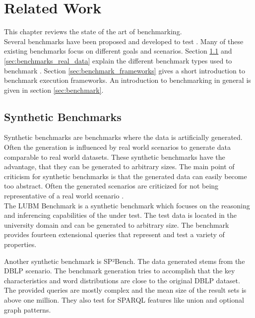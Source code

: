 \chapter{Related Work}
\label{ch:related_work}

This chapter reviews the state of the art of \ts{} benchmarking.\\

Several benchmarks have been proposed and developed to test \tsp{}.
Many of these existing benchmarks focus on different goals and scenarios.
Section \ref{sec:synthetic_benchmarks} and \ref{sec:benchmarks_real_data} explain the different benchmark types used to benchmark \tsp{}.
Section \ref{sec:benchmark_frameworks} gives a short introduction to benchmark execution frameworks.
An introduction to benchmarking in general is given in section \ref{sec:benchmark}.

\section{Synthetic Benchmarks}
\label{sec:synthetic_benchmarks}
Synthetic benchmarks are benchmarks where the data is artificially generated.
Often the generation is influenced by real world scenarios to generate data comparable to real world datasets\cite{guoLUBMBenchmarkOWL2005}.
These synthetic benchmarks have the advantage, that they can be generated to arbitrary sizes.
The main point of criticism for synthetic benchmarks is that the generated data can easily become too abstract.
Often the generated scenarios are criticized for not being representative of a real world scenario \cite{saleemFEASIBLEFeatureBasedSPARQL2015}.
\\

The LUBM Benchmark\cite{guoLUBMBenchmarkOWL2005} is a synthetic benchmark which focuses on the reasoning and inferencing capabilities of the \tsp{} under test.
The test data is located in the university domain and can be generated to arbitrary size.
The benchmark provides fourteen extensional queries that represent and test a variety of properties.

Another synthetic benchmark is SP²Bench\cite{schmidtSP2BenchSPARQLPerformance2008}.
The data generated stems from the DBLP scenario. The benchmark generation tries to accomplish that the key characteristics and word distributions are close to the original DBLP dataset.
The provided queries are mostly complex and the mean size of the result sets is above one million\cite{saleemFEASIBLEFeatureBasedSPARQL2015}.
They also test for SPARQL features like union and optional graph patterns.

